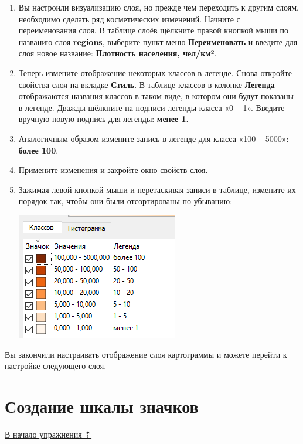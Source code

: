 \documentclass[
  12pt,
]{book}
\begin{document}
\begin{enumerate}
\def\labelenumi{\arabic{enumi}.}
\setcounter{enumi}{14}
\item
  Вы настроили визуализацию слоя, но прежде чем переходить к другим слоям, необходимо сделать ряд косметических изменений. Начните с переименования слоя. В таблице слоёв щёлкните правой кнопкой мыши по названию слоя \textbf{regions}, выберите пункт меню \textbf{Переименовать} и введите для слоя новое название: \textbf{Плотность населения, чел/км²}.
\item
  Теперь измените отображение некоторых классов в легенде. Снова откройте свойства слоя на вкладке \textbf{Стиль}. В таблице классов в колонке \textbf{Легенда} отображаются названия классов в таком виде, в котором они будут показаны в легенде. Дважды щёлкните на подписи легенды класса «0 -- 1». Введите вручную новую подпись для легенды: \textbf{менее 1}.
\item
  Аналогичным образом измените запись в легенде для класса «100 -- 5000»: \textbf{более 100}.
\item
  Примените изменения и закройте окно свойств слоя.
\item
  Зажимая левой кнопкой мыши и перетаскивая записи в таблице, измените их порядок так, чтобы они были отсортированы по убыванию:

  \includegraphics{images/Ex03/descending_order.png}
\end{enumerate}

Вы закончили настраивать отображение слоя картограммы и можете перейти к настройке следующего слоя.

\hypertarget{map-design-population-symbols}{%
\section{Создание шкалы значков}\label{map-design-population-symbols}}

\protect\hyperlink{map-design-population}{В начало упражнения ⇡}
\end{document}

